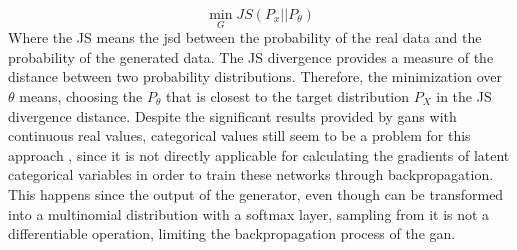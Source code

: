 \begin{equation}
\min_{G} JS(P_{x}||P_{\theta})
\end{equation}
Where the JS means the \acl{jsd} between the probability of the real data and the probability of the generated data. The JS divergence provides a measure of the distance between two probability distributions. Therefore, the minimization over $\theta$ means, choosing the $P_{\theta}$ that is closest to the target distribution $P_{X}$ in the JS divergence distance. Despite the significant results provided by \acp{gan} with continuous real values, categorical values still seem to be a problem for this approach \cite{kusner_gans_2016}, since it is not directly applicable for calculating the gradients of latent categorical variables in order to train these networks through backpropagation. This happens since the output of the generator, even though can be transformed into a multinomial distribution with a softmax layer, sampling from it is not a differentiable operation, limiting the backpropagation process of the \ac{gan}.


